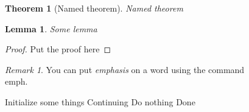\documentclass[12pt, letterpaper]{article}
\theoremstyle{plain}
\newtheorem{theorem}{Theorem}[section]
\newtheorem{lemma}{Lemma}[section]
\theoremstyle{remark}
\newtheorem{remark}{Remark}
\begin{document}
\begin{theorem}[Named theorem]\label{theorem:named_theorem}
    Named theorem
\end{theorem}

\begin{lemma}
    Some lemma
\end{lemma}

\begin{proof}
    Put the proof here
\end{proof}

\begin{remark}
    You can put \emph{emphasis} on a word using the command \\emph.
\end{remark}

\begin{algorithmic}
    \State Initialize some things
    \Statex Continuing
        \State {}
        \Else
        \State Do nothing
        \EndIf
    \EndFor
    \State \Output Done
\end{algorithmic}



\end{document}

